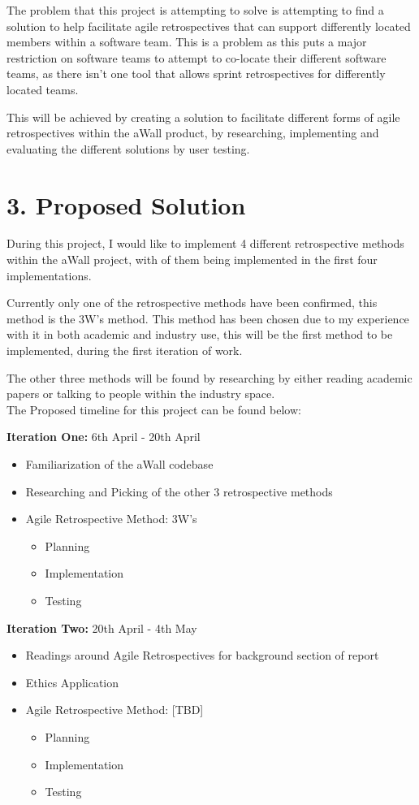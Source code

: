 \documentclass[11pt, a4paper, twoside, openright]{report}
\begin{document}
The problem that this project is attempting to solve is attempting to find a solution to help facilitate agile retrospectives that can support differently located members within a software team. This is a problem as this puts a major restriction on software teams to attempt to co-locate their different software teams, as there isn’t one tool that allows sprint retrospectives for differently located teams. 

This will be achieved by creating a solution to facilitate different forms of agile retrospectives within the aWall product, by researching, implementing and evaluating the different solutions by user testing.

\section*{3. Proposed Solution}
During this project, I would like to implement 4 different retrospective methods within the aWall project, with of them being implemented in the first four implementations.

Currently only one of the retrospective methods have been confirmed, this method is the 3W's method. 
This method has been chosen due to my experience with it in both academic and industry use, this will be the first method to be implemented, during the first iteration of work.

The other three methods will be found by researching by either reading academic papers or talking to people within the industry space. \\

The Proposed timeline for this project can be found below:

\textbf{Iteration One:}  6th April - 20th April
\begin{itemize}
\item Familiarization of the aWall codebase
\item Researching and Picking of the other 3 retrospective methods
\item Agile Retrospective Method: 3W's
	\begin{itemize}
		\item Planning
        \item Implementation
        \item Testing
	\end{itemize}
\end{itemize}

\textbf{Iteration Two:}  20th April - 4th May
\begin{itemize}
\item Readings around Agile Retrospectives for background section of report
\item Ethics Application
\item Agile Retrospective Method: [TBD]
	\begin{itemize}
		\item Planning
        \item Implementation
        \item Testing
	\end{itemize}
\end{itemize}
\end{document}
